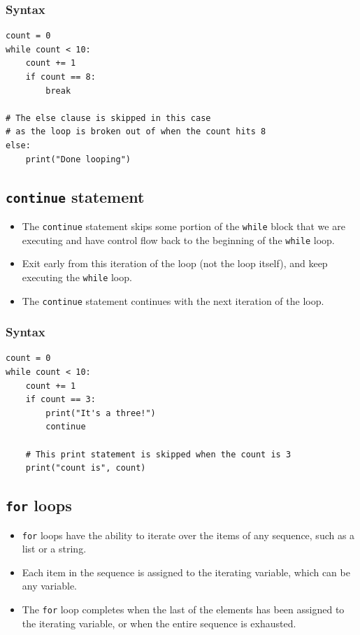 \documentclass[11pt]{article}
\begin{document}
\subsubsection{Syntax}
\label{sec:org0b227e2}
\begin{verbatim}
count = 0
while count < 10:
    count += 1
    if count == 8:
        break

# The else clause is skipped in this case
# as the loop is broken out of when the count hits 8
else:
    print("Done looping")
\end{verbatim}

 \newpage

\subsection{\texttt{continue} statement}
\label{sec:orgc10453f}
\begin{itemize}
\item The \texttt{continue} statement skips some portion of the \texttt{while} block that we are executing and have control flow back to the beginning of the \texttt{while} loop.
\item Exit early from this iteration of the loop (not the loop itself), and keep executing the \texttt{while} loop.
\item The \texttt{continue} statement continues with the next iteration of the loop.
\end{itemize}

\subsubsection{Syntax}
\label{sec:org870688d}
\begin{verbatim}
count = 0
while count < 10:
    count += 1
    if count == 3:
        print("It's a three!")
        continue

    # This print statement is skipped when the count is 3
    print("count is", count)
\end{verbatim}

 \newpage

\subsection{\texttt{for} loops}
\label{sec:org5da73cc}
\begin{itemize}
\item \texttt{for} loops have the ability to iterate over the items of any sequence, such as a list or a string.
\item Each item in the sequence is assigned to the iterating variable, which can be any variable.
\item The \texttt{for} loop completes when the last of the elements has been assigned to the iterating variable, or when the entire sequence is exhausted.
\end{itemize}
\end{document}
